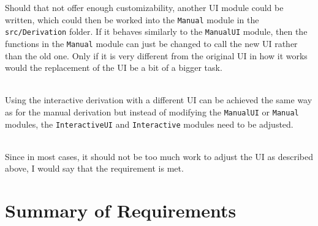 Should that not offer enough customizability,
another UI module could be written,
which could then be worked into the \texttt{Manual} module in the \texttt{src/Derivation} folder.
If it behaves similarly to the \texttt{ManualUI} module,
then the functions in the \texttt{Manual} module can just be changed to call the new UI rather than the old one.
Only if it is very different from the original UI in how it works would the replacement of the UI be a bit of a bigger task.

\ \\
Using the interactive derivation with a different UI can be achieved the same way as for the manual derivation but instead of modifying the \texttt{ManualUI} or \texttt{Manual} modules,
the \texttt{InteractiveUI} and \texttt{Interactive} modules need to be adjusted.

\ \\
Since in most cases,
it should not be too much work to adjust the UI as described above,
I would say that the requirement is met.

\section{Summary of Requirements}

\begin{table}[ht!]
    \caption{Summary of which requirements have been met and which have not.}
    \label{tab:RequirementSummary}
\end{table}


